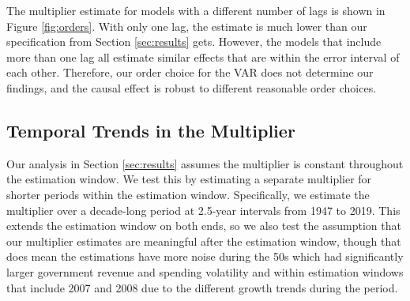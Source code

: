 The multiplier estimate for models with a different number of lags is shown in Figure \ref{fig:orders}. With only one lag, the estimate is much lower than our specification from Section \ref{sec:results} gets. However, the models that include more than one lag all estimate similar effects that are within the error interval of each other. Therefore, our order choice for the VAR does not determine our findings, and the causal effect is robust to different reasonable order choices.


\subsection{Temporal Trends in the Multiplier}

Our analysis in Section \ref{sec:results} assumes the multiplier is constant throughout the estimation window. We test this by estimating a separate multiplier for shorter periods within the estimation window. Specifically, we estimate the multiplier over a decade-long period at 2.5-year intervals from 1947 to 2019. This extends the estimation window on both ends, so we also test the assumption that our multiplier estimates are meaningful after the estimation window, though that does mean the estimations have more noise during the 50s which had significantly larger government revenue and spending volatility and within estimation windows that include 2007 and 2008 due to the different growth trends during the period.

